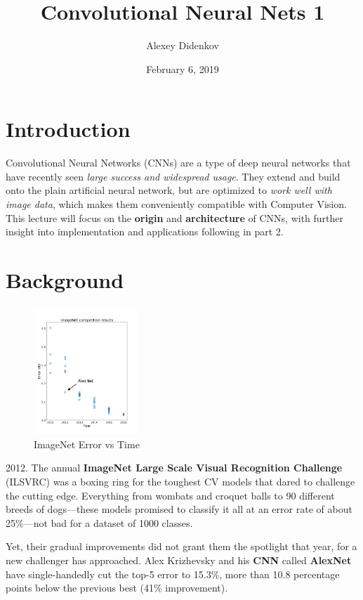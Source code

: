\documentclass{article}
\title{Convolutional Neural Nets 1}
\author{Alexey Didenkov}
\date{February 6, 2019}
\begin{document}
\maketitle

\section{Introduction}
Convolutional Neural Networks (CNNs) are a type of deep neural networks that have recently seen \textit{large success and widespread usage}. They extend and build onto the plain artificial neural network, but are optimized to \textit{work well with image data}, which makes them conveniently compatible with Computer Vision. This lecture will focus on the \textbf{origin} and \textbf{architecture} of CNNs, with further insight into implementation and applications following in part 2.


\section{Background}
\begin{figure}
  \vspace{-50pt}
  \begin{center}
    \includegraphics[width=0.35\textwidth]{ImageNet_history.png}
  \end{center}
  \vspace{-25pt}
  \caption{ImageNet Error vs Time}
\end{figure}
2012. The annual \textbf{ImageNet Large Scale Visual Recognition Challenge} (ILSVRC) was a boxing ring for the toughest CV models that dared to challenge the cutting edge. Everything from wombats and croquet balls to 90 different breeds of dogs—these models promised to classify it all at an error rate of about 25\%—not bad for a dataset of 1000 classes.

Yet, their gradual improvements did not grant them the spotlight that year, for a new challenger has approached. Alex Krizhevsky and his \textbf{CNN} called \textbf{AlexNet} have single-handedly cut the top-5 error to 15.3\%, more than 10.8 percentage points below the previous best (41\% improvement).
\end{document}
